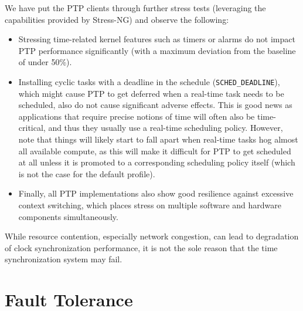 We have put the PTP clients through further stress tests (leveraging the capabilities provided by Stress-NG) and observe the following:%
\begin{itemize}
    \item Stressing time-related kernel features such as timers or alarms do not impact PTP performance significantly (with a maximum deviation from the baseline of under 50\%).
    \item Installing cyclic tasks with a deadline in the schedule (\texttt{SCHED\_DEADLINE}), which might cause PTP to get deferred when a real-time task needs to be scheduled, also do not cause significant adverse effects. This is good news as applications that require precise notions of time will often also be time-critical, and thus they usually use a real-time scheduling policy. However, note that things will likely start to fall apart when real-time tasks hog almost all available compute, as this will make it difficult for PTP to get scheduled at all unless it is promoted to a corresponding scheduling policy itself (which is not the case for the default profile).
    \item Finally, all PTP implementations also show good resilience against excessive context switching, which places stress on multiple software and hardware components simultaneously.
\end{itemize}

While resource contention, especially network congestion, can lead to degradation of clock synchronization performance, it is not the sole reason that the time synchronization system may fail.


\section{Fault Tolerance}
\label{sec:fault_tolerance}
\newcommand{\faultLength}{30 seconds}

